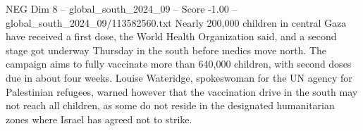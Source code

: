 \begin{textsample}{NEG Dim 8 – global\_south\_2024\_09 – Score -1.00 – global\_south\_2024\_09/113582560.txt}
Nearly 200,000 children in central Gaza have received a first dose, the World Health Organization said, and a second stage got underway Thursday in the south before medics move north.
The campaign aims to fully vaccinate more than 640,000 children, with second doses due in about four weeks.
Louise Wateridge, spokeswoman for the UN agency for Palestinian refugees, warned however that the vaccination drive in the south may not reach all children, as some do not reside in the designated humanitarian zones where Israel has agreed not to strike.

\end{textsample}
